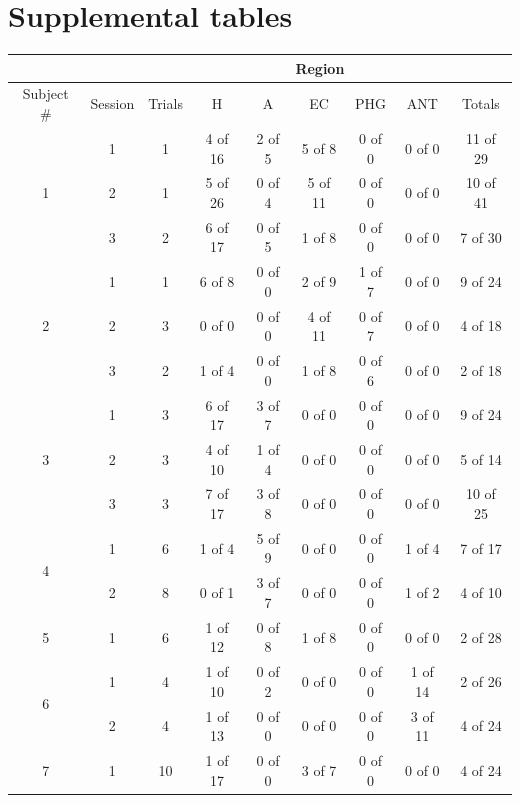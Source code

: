 \section{Supplemental tables}
\begin{table}[ph]
\centering
 \begin{tabular}{|ccc|ccccc||c|}

\multicolumn{3}{c|}{} & \multicolumn{5}{|c||}{Region} & \multicolumn{1}{c}{}\\\hline
      Subject $\#$ & Session & Trials & H & A & EC & PHG & ANT & Totals\\\hline
      \multirow{3}{*}{1} & 1 & 1 & 4 of 16 & 2 of 5 & 5 of 8 & 0 of 0 & 0 of 0 & 11 of 29\\
      & 2 & 1 & 5 of 26 & 0 of 4 & 5 of 11 & 0 of 0 & 0 of 0 & 10 of 41\\
      & 3 & 2 & 6 of 17 & 0 of 5 & 1 of 8 & 0 of 0 & 0 of 0 & 7 of 30\\\hline
      \multirow{3}{*}{2} & 1 & 1 & 6 of 8 & 0 of 0 & 2 of 9 & 1 of 7 & 0 of 0 & 9 of 24\\
      & 2 & 3 & 0 of 0 & 0 of 0 & 4 of 11 & 0 of 7 & 0 of 0 & 4 of 18\\
      & 3 & 2 & 1 of 4 & 0 of 0 & 1 of 8 & 0 of 6 & 0 of 0 & 2 of 18\\\hline
      \multirow{3}{*}{3} & 1 & 3 & 6 of 17 & 3 of 7 & 0 of 0 & 0 of 0 & 0 of 0 & 9 of 24\\
      & 2 & 3 & 4 of 10 & 1 of 4 & 0 of 0 & 0 of 0 & 0 of 0 & 5 of 14\\
      & 3 & 3 & 7 of 17 & 3 of 8 & 0 of 0 & 0 of 0 & 0 of 0 & 10 of 25\\\hline
      \multirow{2}{*}{4} & 1 & 6 & 1 of 4 & 5 of 9 & 0 of 0 & 0 of 0 & 1 of 4 & 7 of 17\\
      & 2 & 8 & 0 of 1 & 3 of 7 & 0 of 0 & 0 of 0 & 1 of 2 & 4 of 10\\\hline
      5 & 1 & 6 & 1 of 12 & 0 of 8 & 1 of 8 & 0 of 0 & 0 of 0 & 2 of 28\\\hline
      \multirow{2}{*}{6} & 1 & 4 & 1 of 10 & 0 of 2 & 0 of 0 & 0 of 0 & 1 of 14 & 2 of 26\\
      & 2 & 4 & 1 of 13 & 0 of 0 & 0 of 0 & 0 of 0 & 3 of 11 & 4 of 24\\\hline
      \multirow{2}{*}{7}  & 1 & 10 & 1 of 17 & 0 of 0 & 3 of 7 & 0 of 0 & 0 of 0 & 4 of 24\\

\end{tabular}
\end{table}
